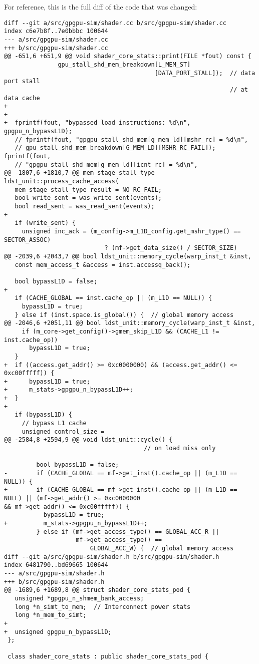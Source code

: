 \documentclass{article}
\begin{document}
\newpage
For reference, this is the full diff of the code that was changed:
\begin{verbatim}
diff --git a/src/gpgpu-sim/shader.cc b/src/gpgpu-sim/shader.cc
index c6e7b8f..7e0bbbc 100644
--- a/src/gpgpu-sim/shader.cc
+++ b/src/gpgpu-sim/shader.cc
@@ -651,6 +651,9 @@ void shader_core_stats::print(FILE *fout) const {
               gpu_stall_shd_mem_breakdown[L_MEM_ST]
                                          [DATA_PORT_STALL]);  // data port stall
                                                               // at data cache
+
+
+  fprintf(fout, "bypassed load instructions: %d\n", gpgpu_n_bypassL1D);
   // fprintf(fout, "gpgpu_stall_shd_mem[g_mem_ld][mshr_rc] = %d\n",
   // gpu_stall_shd_mem_breakdown[G_MEM_LD][MSHR_RC_FAIL]); fprintf(fout,
   // "gpgpu_stall_shd_mem[g_mem_ld][icnt_rc] = %d\n",
@@ -1807,6 +1810,7 @@ mem_stage_stall_type ldst_unit::process_cache_access(
   mem_stage_stall_type result = NO_RC_FAIL;
   bool write_sent = was_write_sent(events);
   bool read_sent = was_read_sent(events);
+
   if (write_sent) {
     unsigned inc_ack = (m_config->m_L1D_config.get_mshr_type() == SECTOR_ASSOC)
                            ? (mf->get_data_size() / SECTOR_SIZE)
@@ -2039,6 +2043,7 @@ bool ldst_unit::memory_cycle(warp_inst_t &inst,
   const mem_access_t &access = inst.accessq_back();
 
   bool bypassL1D = false;
+
   if (CACHE_GLOBAL == inst.cache_op || (m_L1D == NULL)) {
     bypassL1D = true;
   } else if (inst.space.is_global()) {  // global memory access
@@ -2046,6 +2051,11 @@ bool ldst_unit::memory_cycle(warp_inst_t &inst,
     if (m_core->get_config()->gmem_skip_L1D && (CACHE_L1 != inst.cache_op))
       bypassL1D = true;
   }
+  if ((access.get_addr() >= 0xc0000000) && (access.get_addr() <= 0xc00fffff)) {
+      bypassL1D = true;
+      m_stats->gpgpu_n_bypassL1D++;
+  }
+
   if (bypassL1D) {
     // bypass L1 cache
     unsigned control_size =
@@ -2584,8 +2594,9 @@ void ldst_unit::cycle() {
                                       // on load miss only
 
         bool bypassL1D = false;
-        if (CACHE_GLOBAL == mf->get_inst().cache_op || (m_L1D == NULL)) {
+        if (CACHE_GLOBAL == mf->get_inst().cache_op || (m_L1D == NULL) || (mf->get_addr() >= 0xc0000000 
&& mf->get_addr() <= 0xc00fffff)) {
           bypassL1D = true;
+          m_stats->gpgpu_n_bypassL1D++;
         } else if (mf->get_access_type() == GLOBAL_ACC_R ||
                    mf->get_access_type() ==
                        GLOBAL_ACC_W) {  // global memory access
diff --git a/src/gpgpu-sim/shader.h b/src/gpgpu-sim/shader.h
index 6481790..bd69665 100644
--- a/src/gpgpu-sim/shader.h
+++ b/src/gpgpu-sim/shader.h
@@ -1689,6 +1689,8 @@ struct shader_core_stats_pod {
   unsigned *gpgpu_n_shmem_bank_access;
   long *n_simt_to_mem;  // Interconnect power stats
   long *n_mem_to_simt;
+
+  unsigned gpgpu_n_bypassL1D;
 };
 
 class shader_core_stats : public shader_core_stats_pod {
\end{verbatim}
\end{document}
